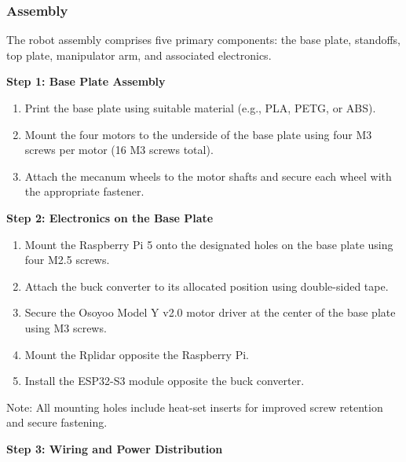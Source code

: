\documentclass{article}
\begin{document}
\subsubsection{Assembly}

The robot assembly comprises five primary components: the base plate, standoffs, top plate, manipulator arm, and associated electronics. 

\textbf{Step 1: Base Plate Assembly}

\begin{enumerate}
  \item Print the base plate using suitable material (e.g., PLA, PETG, or ABS). 

  \item Mount the four motors to the underside of the base plate using four M3 screws per motor (16 M3 screws total). 
  
  \item Attach the mecanum wheels to the motor shafts and secure each wheel with the appropriate fastener. 
\end{enumerate}

\textbf{Step 2: Electronics on the Base Plate}

\begin{enumerate}
  \item Mount the Raspberry Pi 5 onto the designated holes on the base plate using four M2.5 screws. 

  \item Attach the buck converter to its allocated position using double-sided tape. 
  
  \item Secure the Osoyoo Model Y v2.0 motor driver at the center of the base plate using M3 screws. 
  
  \item Mount the Rplidar opposite the Raspberry Pi. 
  
  \item Install the ESP32-S3 module opposite the buck converter. 
\end{enumerate}

Note: All mounting holes include heat-set inserts for improved screw retention and secure fastening. 

\textbf{Step 3: Wiring and Power Distribution}
\end{document}
